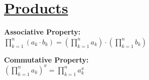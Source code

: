 \documentclass[12pt]{article}
\begin{document}
\section*{\underline{\textbf{Products}}}
\begin{minipage}{\textwidth}
    \textbf{Associative Property:}
    \\ \( \displaystyle\prod_{k = 1}^{n} {(a_k \cdot b_k)} = \left( \displaystyle\prod_{k = 1}^{n} {a_k} \right) \cdot \left( \displaystyle\prod_{k = 1}^{n} {b_k} \right) \)
\end{minipage}
\begin{minipage}{\textwidth}
    \textbf{Commutative Property:}
    \\ \( \left( \displaystyle\prod_{k = 1}^{n} {a_k} \right)^x = \displaystyle\prod_{k = 1}^{n} {a_k^x} \)
\end{minipage}
\end{document}

